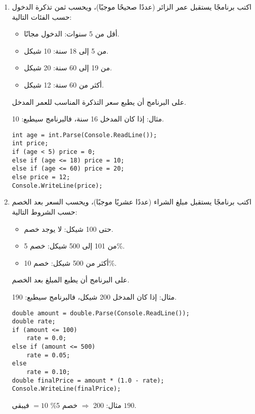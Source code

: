 \documentclass[12pt]{article}
\begin{document}
\begin{enumerate}[itemsep=2em]
\item
اكتب برنامجًا يستقبل عمر الزائر (عددًا صحيحًا موجبًا)، ويحسب ثمن تذكرة الدخول حسب الفئات التالية:

\begin{itemize}
  \item أقل من 5 سنوات: الدخول مجانًا.
  \item من 5 إلى 18 سنة: 10 شيكل.
  \item من 19 إلى 60 سنة: 20 شيكل.
  \item أكثر من 60 سنة: 12 شيكل.
\end{itemize}

على البرنامج أن يطبع سعر التذكرة المناسب للعمر المدخل.

مثال: إذا كان المدخل 16 سنة، فالبرنامج سيطبع: 10.

\ifwithsols
\begin{boxSolution}
\begin{english}
\begin{verbatim}
int age = int.Parse(Console.ReadLine());
int price;
if (age < 5) price = 0;
else if (age <= 18) price = 10;
else if (age <= 60) price = 20;
else price = 12;
Console.WriteLine(price);
\end{verbatim}
\end{english}
\end{boxSolution}
\fi


\item
اكتب برنامجًا يستقبل مبلغ الشراء (عددًا عشريًا موجبًا)، ويحسب السعر بعد الخصم حسب الشروط التالية:

\begin{itemize}
  \item حتى 100 شيكل: لا يوجد خصم.
  \item من 101 إلى 500 شيكل: خصم 5\%.
  \item أكثر من 500 شيكل: خصم 10\%.
\end{itemize}

على البرنامج أن يطبع المبلغ بعد الخصم.

مثال: إذا كان المدخل 200 شيكل، فالبرنامج سيطبع: 190.

\ifwithsols
\begin{boxSolution}
\begin{english}
\begin{verbatim}
double amount = double.Parse(Console.ReadLine());
double rate;
if (amount <= 100)
    rate = 0.0;
else if (amount <= 500)
    rate = 0.05;
else
    rate = 0.10;
double finalPrice = amount * (1.0 - rate);
Console.WriteLine(finalPrice);
\end{verbatim}
\end{english}
مثال: 200 \(\Rightarrow\) خصم 5\% \(=10\) فيبقى \(190\).
\end{boxSolution}
\fi



\end{enumerate}
\end{document}
